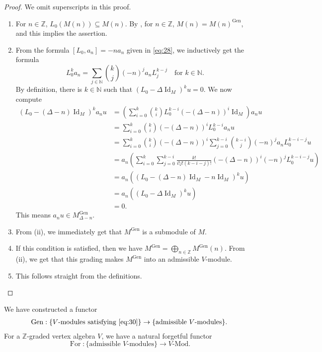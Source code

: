 \documentclass[a4paper, 12pt, reqno]{amsart}
\theoremstyle{remark}
\DeclareMathOperator{\Id}{Id}
\DeclareMathOperator{\For}{For}
\DeclareMathOperator{\Gen}{Gen}
\begin{document}
\begin{proof}
  We omit superscripts in this proof.
  \begin{enumerate}
  \item For $n \in \mathbb{Z}$, $L_0(M(n)) \subseteq M(n)$.
    By \cite[\S6.8 Theorem 12]{hoffman_linear_1971}, for $n \in \mathbb{Z}$, $M(n) = M(n)^{\Gen}$, and this implies the assertion.
  \item From the formula $[L_0, a_n] = -na_n$ given in \eqref{eq:28}, we inductively get the formula
    \begin{equation*}
      L_0^ka_n = \sum_{j \in \mathbb{N}}\binom{k}{j}(-n)^ja_nL_j^{k - j} \quad \text{for $k \in \mathbb{N}$}.
    \end{equation*}
    By definition, there is $k \in \mathbb{N}$ such that $(L_0 - \Delta\Id_M)^ku = 0$.
    We now compute
    \begin{align*}
      (L_0 - (\Delta - n)\Id_M)^ka_nu &= \left(\sum_{i = 0}^k\binom{k}{i}L_0^{k - i}(-(\Delta - n))^i\Id_M\right)a_nu \\
                                      &= \sum_{i = 0}^k\binom{k}{i}(-(\Delta - n))^iL_0^{k - i}a_nu \\
                                      &= \sum_{i = 0}^k\binom{k}{i}(-(\Delta - n))^i\sum_{j = 0}^{k - i}\binom{k - i}{j}(-n)^ja_nL_0^{k - i - j}u \\
                                      &= a_n\left(\sum_{i = 0}^k\sum_{j = 0}^{k - i}\frac{k!}{i!j!(k - i - j)!}(-(\Delta - n))^i(-n)^jL_0^{k - i - j}u\right) \\
                                      &= a_n((L_0 - (\Delta - n)\Id_M - n\Id_M)^ku) \\
                                      &= a_n((L_0 - \Delta\Id_M)^ku) \\
                                      &= 0.
    \end{align*}
    This means $a_nu \in M^{\Gen}_{\Delta - n}$.
  \item From (ii), we immediately get that $M^{\Gen}$ is a submodule of $M$.
  \item If this condition is satisfied, then we have $M^{\Gen} = \bigoplus_{n \in \mathbb{Z}}M^{\Gen}(n)$.
    From (ii), we get that this grading makes $M^{\Gen}$ into an admissible $V$-module.
  \item This follows straight from the definitions. \qedhere
  \end{enumerate}
\end{proof}
We have constructed a functor
\begin{align*}
  \Gen: \{\text{$V$-modules satisfying \eqref{eq:30}}\} \to \{\text{admissible $V$-modules}\}.
\end{align*}
For a $\mathbb{Z}$-graded vertex algebra $V$, we have a natural forgetful functor
\begin{equation*}
  \For: \{\text{admissible $V$-modules}\} \to \text{$V$-Mod}.
\end{equation*}
\end{document}
